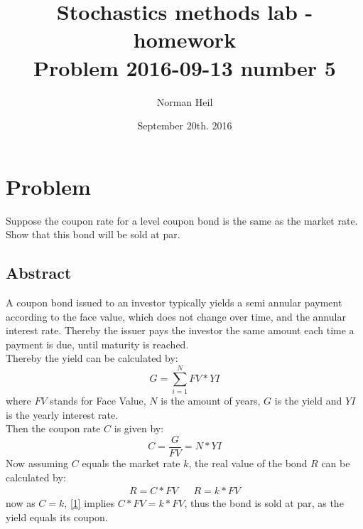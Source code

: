 \documentclass{article}
\title{Stochastics methods lab - homework\\[0.5cm]
\large Problem 2016-09-13 number 5}
\author{Norman Heil}
\date{September 20th. 2016}
\begin{document}
\maketitle
\section{Problem}
Suppose the coupon rate for a level coupon bond is the same as the market rate. Show that this bond will be sold at par.
\subsection{Abstract}
A coupon bond issued to an investor typically yields a semi annular payment according to the face value, which does not change over time, and the annular interest rate. Thereby the issuer pays the investor the same amount each time a payment is due, until maturity is reached. \\
Thereby the yield can be calculated by:
\begin{equation}
G=\sum_{i=1}^{N} FV* YI
\end{equation}
where $FV$ stands for Face Value, $N$ is the amount of years, $G$ is the yield and $YI$ is the yearly interest rate.\\
Then the coupon rate $C$ is given by:
\begin{equation}
C=\frac{G}{FV}=N* YI
\end{equation}
Now assuming $C$ equals the market rate $k$, the real value of the bond $R$ can be calculated by:
\begin{align}
    R=C*FV&&R=k*FV \label{1}
\end{align}
now as $C=k$, \ref{1} implies $C*FV=k*FV$, thus the bond is sold at par, as the yield equals its coupon.
\end{document}
